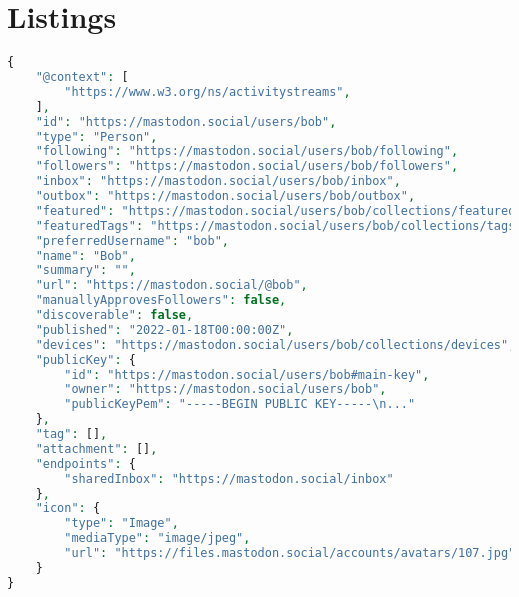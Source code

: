 \chapter{Listings}


\lstset{style=JSONStyle}
\begin{lstlisting}[language=PHP, caption=Mastodon extended version of ActivityPub's actor object of user bob@mastodon.social, label=fig:mastodon_actor_object, float=ht]
{
    "@context": [
        "https://www.w3.org/ns/activitystreams",
    ],
    "id": "https://mastodon.social/users/bob",
    "type": "Person",
    "following": "https://mastodon.social/users/bob/following",
    "followers": "https://mastodon.social/users/bob/followers",
    "inbox": "https://mastodon.social/users/bob/inbox",
    "outbox": "https://mastodon.social/users/bob/outbox",
    "featured": "https://mastodon.social/users/bob/collections/featured",
    "featuredTags": "https://mastodon.social/users/bob/collections/tags",
    "preferredUsername": "bob",
    "name": "Bob",
    "summary": "",
    "url": "https://mastodon.social/@bob",
    "manuallyApprovesFollowers": false,
    "discoverable": false,
    "published": "2022-01-18T00:00:00Z",
    "devices": "https://mastodon.social/users/bob/collections/devices",
    "publicKey": {
        "id": "https://mastodon.social/users/bob#main-key",
        "owner": "https://mastodon.social/users/bob",
        "publicKeyPem": "-----BEGIN PUBLIC KEY-----\n..."
    },
    "tag": [],
    "attachment": [],
    "endpoints": {
        "sharedInbox": "https://mastodon.social/inbox"
    },
    "icon": {
        "type": "Image",
        "mediaType": "image/jpeg",
        "url": "https://files.mastodon.social/accounts/avatars/107.jpg"
    }
}
\end{lstlisting}


